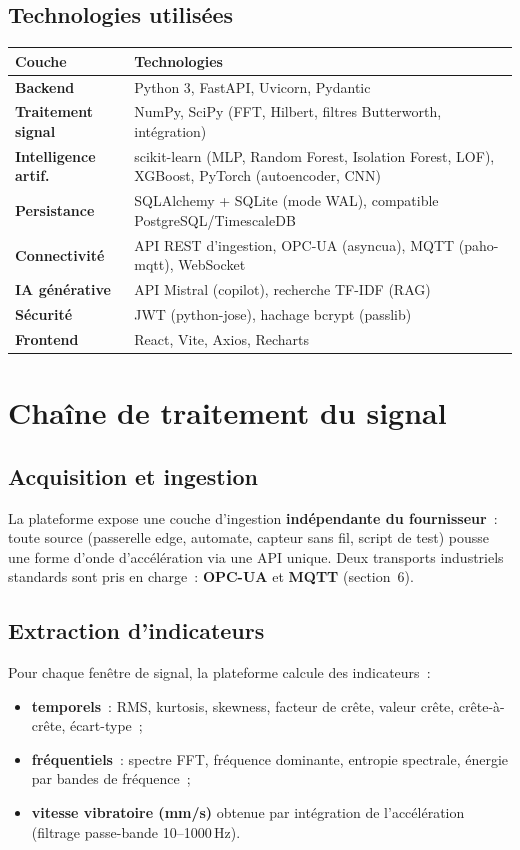\documentclass[12pt,a4paper]{article}
\begin{document}
\subsection{Technologies utilisées}
\begin{center}
\begin{tabular}{>{\bfseries}p{3.2cm} p{10.5cm}}
\toprule
Couche & Technologies \\
\midrule
Backend & Python 3, FastAPI, Uvicorn, Pydantic \\
Traitement signal & NumPy, SciPy (FFT, Hilbert, filtres Butterworth, intégration) \\
Intelligence artif. & scikit-learn (MLP, Random Forest, Isolation Forest, LOF), XGBoost, PyTorch (autoencoder, CNN) \\
Persistance & SQLAlchemy + SQLite (mode WAL), compatible PostgreSQL/TimescaleDB \\
Connectivité & API REST d'ingestion, OPC-UA (asyncua), MQTT (paho-mqtt), WebSocket \\
IA générative & API Mistral (copilot), recherche TF-IDF (RAG) \\
Sécurité & JWT (python-jose), hachage bcrypt (passlib) \\
Frontend & React, Vite, Axios, Recharts \\
\bottomrule
\end{tabular}
\end{center}

\section{Chaîne de traitement du signal}

\subsection{Acquisition et ingestion}
La plateforme expose une couche d'ingestion \textbf{indépendante du fournisseur}~: toute
source (passerelle edge, automate, capteur sans fil, script de test) pousse une forme
d'onde d'accélération via une API unique. Deux transports industriels standards sont
pris en charge~: \textbf{OPC-UA} et \textbf{MQTT} (section~6).

\subsection{Extraction d'indicateurs}
Pour chaque fenêtre de signal, la plateforme calcule des indicateurs~:
\begin{itemize}[leftmargin=1.4em]
  \item \textbf{temporels}~: RMS, kurtosis, skewness, facteur de crête, valeur crête,
        crête-à-crête, écart-type~;
  \item \textbf{fréquentiels}~: spectre FFT, fréquence dominante, entropie spectrale,
        énergie par bandes de fréquence~;
  \item \textbf{vitesse vibratoire (mm/s)} obtenue par intégration de l'accélération
        (filtrage passe-bande 10--1000\,Hz).
\end{itemize}
\end{document}
